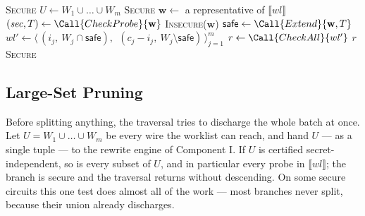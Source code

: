 \begin{algorithm}
\caption{Traversing the subset space (Component II)}
\label{alg:subset-space}
\begin{algorithmic}[1]
   \Return \textsc{Secure}  \EndIf
  \State $U \gets W_1 \cup \dots \cup W_m$
   \Return \textsc{Secure}  \EndIf
  \State $\mathbf{w} \gets$ a representative of $\llbracket wl \rrbracket$ 
  \State $(\mathit{sec}, T) \gets \Call{CheckProbe}{\mathbf{w}}$ 
   \Return \textsc{Insecure}($\mathbf{w}$) \EndIf
  \State $\mathsf{safe} \gets \Call{Extend}{\mathbf{w}, T}$ 
    \State $wl' \gets \big\langle\, (i_j,\ W_j \cap \mathsf{safe}),\ \ (c_j - i_j,\ W_j \setminus \mathsf{safe}) \,\big\rangle_{j=1}^{m}$ 
    \State $r \gets \Call{CheckAll}{wl'}$
     \Return $r$ \EndIf
  \EndFor
  \State \Return \textsc{Secure}
\EndFunction
\end{algorithmic}
\end{algorithm}

  \subsection{Large-Set Pruning}
  \label{sec:large-set-pruning}

  Before splitting anything, the traversal tries to discharge the whole batch at
  once. Let $U = W_1 \cup \dots \cup W_m$ be every wire the worklist can reach,
  and hand $U$ --- as a single tuple --- to the rewrite engine of Component I. If
  $U$ is certified secret-independent, so is every subset of $U$, and in
  particular every probe in $\llbracket wl \rrbracket$; the branch is secure and
  the traversal returns without descending. On some secure circuits this one test
  does almost all of the work --- most branches never split, because their union
  already discharges.

